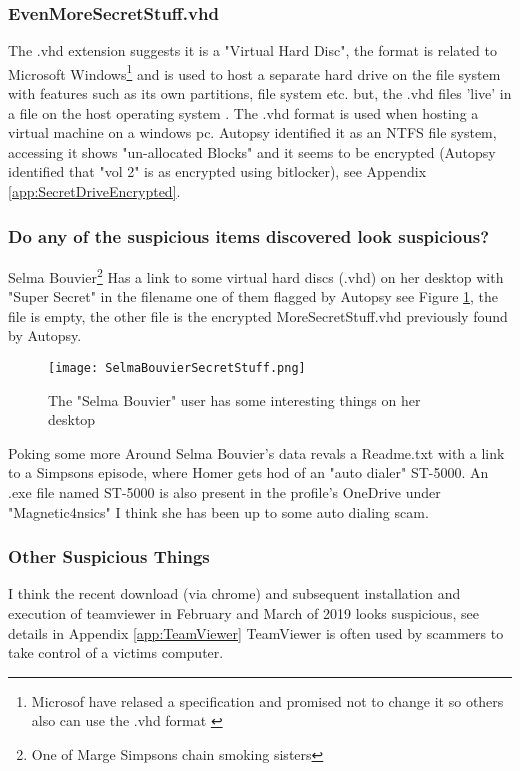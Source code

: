 \documentclass[
	letterpaper, %
	10pt, %
	unnumberedsections, %
	twoside, %
]{APAAssignment}
\begin{document}
\subsubsection{EvenMoreSecretStuff.vhd}
The .vhd extension suggests it is a "Virtual Hard Disc", the format is related to Microsoft Windows\footnote{Microsof have relased a specification and promised not to change it so others also can use the .vhd format \cite{VHD_Wiki}} and is used to host a separate hard drive on the file system with features such as its own partitions, file system etc. but, the .vhd files 'live' in a file on the host operating system \cite{VHD_Wiki}. The .vhd format is used when hosting a virtual machine on a windows pc. Autopsy identified it as an NTFS file system, accessing it shows "un-allocated Blocks" and it seems to be encrypted (Autopsy identified that "vol 2" is as encrypted using bitlocker), see Appendix \ref{app:SecretDriveEncrypted}.


\subsubsection{Do any of the suspicious items discovered look suspicious?}
Selma Bouvier\footnote{One of Marge Simpsons chain smoking sisters} Has a link to some virtual hard discs (.vhd) on her desktop with "Super Secret" in the filename one of them flagged by Autopsy see Figure \ref{fig:SelmaBouvierSecredStuff}, the file is empty, the other file is the encrypted MoreSecretStuff.vhd previously found by Autopsy.

\begin{figure}[!ht] %
	\centering
	\texttt{[image: SelmaBouvierSecretStuff.png]}
	\caption{The "Selma Bouvier" user has some interesting things on her desktop}
	\label{fig:SelmaBouvierSecredStuff}
\end{figure}


Poking some more Around Selma Bouvier's data revals a Readme.txt with a link to a Simpsons episode, where Homer gets hod of an "auto dialer" ST-5000. An .exe file named ST-5000 is also present in the profile's OneDrive under "Magnetic4nsics" I think she has been up to some auto dialing scam.
\subsubsection{Other Suspicious Things}
I think the recent download (via chrome) and subsequent installation and execution of teamviewer in February and March of 2019 looks suspicious, see details in Appendix \ref{app:TeamViewer} TeamViewer is often used by scammers to take control of a victims computer.
\end{document}
